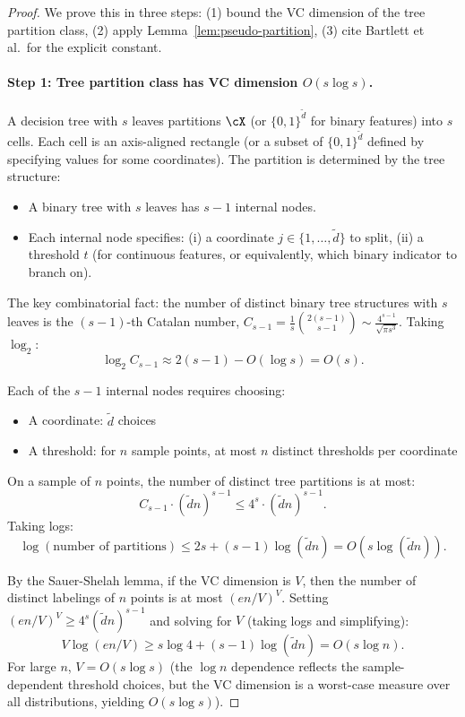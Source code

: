 \begin{proof}
We prove this in three steps: (1) bound the VC dimension of the tree partition class, (2) apply Lemma~\ref{lem:pseudo-partition}, (3) cite Bartlett et al.\ for the explicit constant.

\paragraph{Step 1: Tree partition class has VC dimension $O(s \log s)$.}
A decision tree with $s$ leaves partitions $\cX$ (or $\{0,1\}^{\tilde{d}}$ for binary features) into $s$ cells. Each cell is an axis-aligned rectangle (or a subset of $\{0,1\}^{\tilde{d}}$ defined by specifying values for some coordinates). The partition is determined by the tree structure:
\begin{itemize}
\item A binary tree with $s$ leaves has $s-1$ internal nodes.
\item Each internal node specifies: (i) a coordinate $j \in \{1,\ldots,\tilde{d}\}$ to split, (ii) a threshold $t$ (for continuous features, or equivalently, which binary indicator to branch on).
\end{itemize}

The key combinatorial fact: the number of distinct binary tree structures with $s$ leaves is the $(s-1)$-th Catalan number, $C_{s-1} = \frac{1}{s}\binom{2(s-1)}{s-1} \sim \frac{4^{s-1}}{\sqrt{\pi s^3}}$. Taking $\log_2$:
\[
\log_2 C_{s-1} \approx 2(s-1) - O(\log s) = O(s).
\]

Each of the $s-1$ internal nodes requires choosing:
\begin{itemize}
\item A coordinate: $\tilde{d}$ choices
\item A threshold: for $n$ sample points, at most $n$ distinct thresholds per coordinate
\end{itemize}

On a sample of $n$ points, the number of distinct tree partitions is at most:
\[
C_{s-1} \cdot (\tilde{d} n)^{s-1} \le 4^s \cdot (\tilde{d} n)^{s-1}.
\]
Taking logs:
\[
\log(\text{number of partitions}) \le 2s + (s-1) \log(\tilde{d} n) = O(s \log(\tilde{d} n)).
\]

By the Sauer-Shelah lemma, if the VC dimension is $V$, then the number of distinct labelings of $n$ points is at most $(en/V)^V$. Setting $(en/V)^V \ge 4^s (\tilde{d} n)^{s-1}$ and solving for $V$ (taking logs and simplifying):
\[
V \log(en/V) \ge s \log 4 + (s-1) \log(\tilde{d} n) = O(s \log n).
\]
For large $n$, $V = O(s \log s)$ (the $\log n$ dependence reflects the sample-dependent threshold choices, but the VC dimension is a worst-case measure over all distributions, yielding $O(s \log s)$).


\end{proof}
